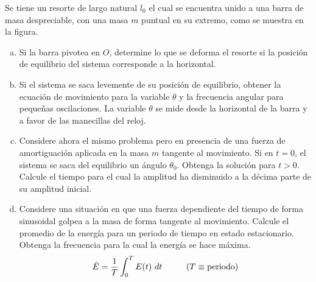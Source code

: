 \newcommand*\plusc{\begin{tikzpicture} \draw[->] (0,-1) arc (-90:90:0.3) node[left,pos=0.5,xshift=2] {\(+\)};\end{tikzpicture}}

\item Se tiene un resorte de largo natural $l_0$ el cual se encuentra unido a una barra de masa despreciable, con una masa $m$ puntual en su extremo, como se muestra en la figura.

\begin{enumerate}[a)]
	\item Si la barra pivotea en $O$, determine lo que se deforma el resorte si la posición de equilibrio del sistema corresponde a la horizontal.
	\item Si el sistema se saca levemente de su posición de equilibrio, obtener la ecuación de movimiento para la variable $\theta$ y la frecuencia angular para pequeñas oscilaciones. La variable $\theta$ se mide desde la horizontal de la barra y a favor de las manecillas del reloj.
	\item Considere ahora el mismo problema pero en presencia de una fuerza de amortiguación aplicada en la masa $m$ tangente al movimiento. Si en $t=0$, el sistema se saca del equilibrio un ángulo $\theta_0$. Obtenga la solución para $t>0$. Calcule el tiempo para el cual la amplitud ha disminuido a la décima parte de su amplitud inicial.
	\item Considere una situación en que una fuerza dependiente del tiempo de forma sinusoidal golpea a la masa de forma tangente al movimiento. Calcule el promedio de la energía para un periodo de tiempo en estado estacionario. Obtenga la frecuencia para la cual la energía se hace máxima.
	\begin{equation*}
		\bar{E} = \dfrac{1}{T} \int_0^T E(t) \ dt \hspace{10mm} (T \equiv \text{periodo})
	\end{equation*}
\end{enumerate}

